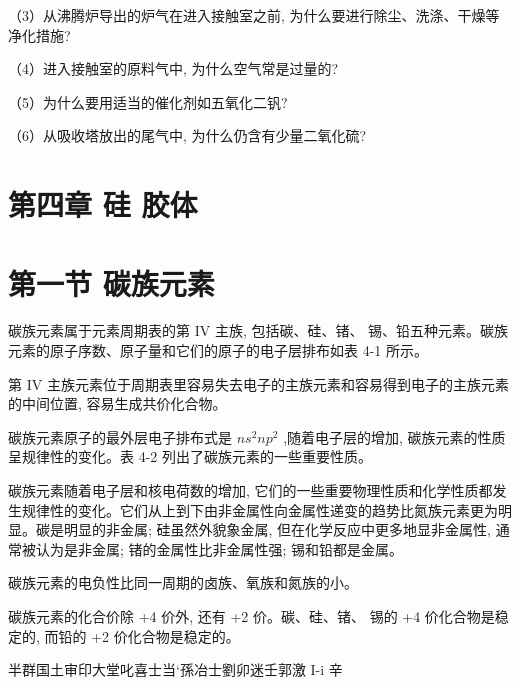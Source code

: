 \documentclass[10pt]{article}
\begin{document}
（3）从沸腾炉导出的炉气在进入接触室之前, 为什么要进行除尘、洗涤、干燥等净化措施?

（4）进入接触室的原料气中, 为什么空气常是过量的?

（5）为什么要用适当的催化剂如五氧化二钒?

（6）从吸收塔放出的尾气中, 为什么仍含有少量二氧化硫?

\section*{第四章 硅 胶体}

\section*{第一节 碳族元素}

碳族元素属于元素周期表的第 IV 主族, 包括碳、硅、锗、 锡、铅五种元素。碳族元素的原子序数、原子量和它们的原子的电子层排布如表 4-1 所示。

第 IV 主族元素位于周期表里容易失去电子的主族元素和容易得到电子的主族元素的中间位置, 容易生成共价化合物。

碳族元素原子的最外层电子排布式是 \(n{s}^{2}n{p}^{2}\) ,随着电子层的增加, 碳族元素的性质呈规律性的变化。表 4-2 列出了碳族元素的一些重要性质。

碳族元素随着电子层和核电荷数的增加, 它们的一些重要物理性质和化学性质都发生规律性的变化。它们从上到下由非金属性向金属性递变的趋势比氮族元素更为明显。碳是明显的非金属; 硅虽然外貌象金属, 但在化学反应中更多地显非金属性, 通常被认为是非金属; 锗的金属性比非金属性强; 锡和铅都是金属。

碳族元素的电负性比同一周期的卤族、氧族和氮族的小。

碳族元素的化合价除 +4 价外, 还有 +2 价。碳、硅、锗、 锡的 +4 价化合物是稳定的, 而铅的 +2 价化合物是稳定的。

半群国土审印大堂叱喜士当`孫冶士劉卯迷壬郭激 I-i 辛
\end{document}
